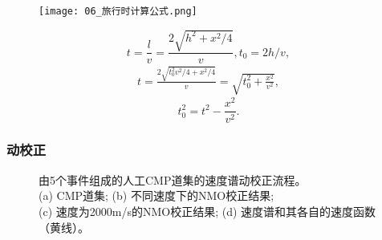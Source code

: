 \documentclass[10pt]{beamer}
\begin{document}
{\begin{frame}[c]
    \vspace{10pt}
    \begin{minipage}{.55\paperwidth}
        \begin{figure}[h]
            \centering
            \texttt{[image: 06\_旅行时计算公式.png]}
        \end{figure}
    \end{minipage}
    \begin{minipage}{.35\paperwidth}
        {\small
        \begin{equation*}
            t=\frac{l}{v}=\frac{2\sqrt{h^2+x^2/4}}{v}, t_0=2h/v, 
        \end{equation*}
        \begin{align*}
            t=\frac{2\sqrt{t_0^2v^2/4+x^2/4}}{v}=\sqrt{t_0^2+\frac{x^2}{v^2}}, 
        \end{align*}
        \begin{equation}
            t_0^2=t^2-\frac{x^2}{v^2}. 
            \label{equ:零偏距旅行时计算公式}
        \end{equation}}
\end{minipage}
\end{frame}

\begin{frame}[c]
    \frametitle{动校正}
    \begin{figure}
        \captionsetup{justification=centering}
        \centering
        \hspace{-8pt}
        \hspace{-8pt}
        \hspace{-8pt}
        \caption{由5个事件组成的人工CMP道集的速度谱动校正流程。\\(a) CMP道集; (b) 不同速度下的NMO校正结果; \\(c) 速度为2000m/s的NMO校正结果; (d) 速度谱和其各自的速度函数（黄线）\!\!\!。}
    \end{figure}
\end{frame}


}
\end{document}
